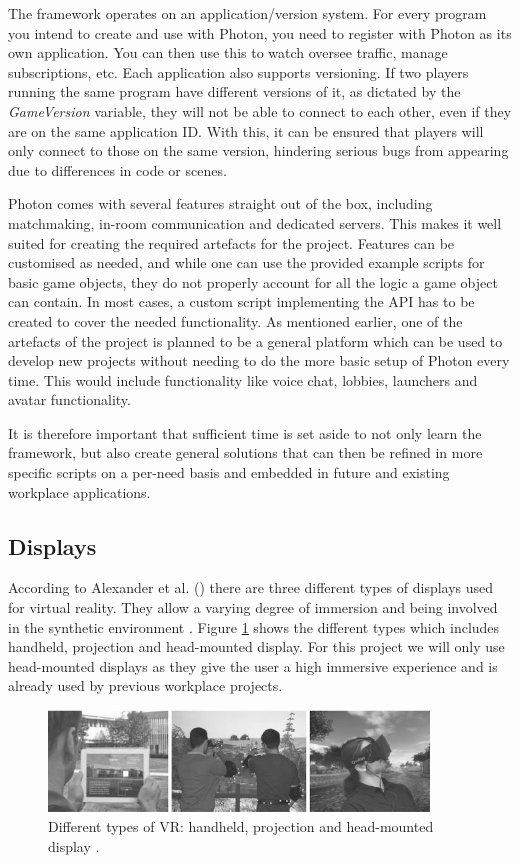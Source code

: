 The framework operates on an application/version system. For every program you intend to create and use with Photon, you need to register with Photon as its own application. You can then use this to watch oversee traffic, manage subscriptions, etc. Each application also supports versioning. If two players running the same program have different versions of it, as dictated by the \textit{GameVersion} variable, they will not be able to connect to each other, even if they are on the same application ID. With this, it can be ensured that players will only connect to those on the same version, hindering serious bugs from appearing due to differences in code or scenes.

Photon comes with several features straight out of the box, including matchmaking, in-room communication and dedicated servers. This makes it well suited for creating the required artefacts for the project. Features can be customised as needed, and while one can use the provided example scripts for basic game objects, they do not properly account for all the logic a game object can contain. In most cases, a custom script implementing the API has to be created to cover the needed functionality. As mentioned earlier, one of the artefacts of the project is planned to be a general platform which can be used to develop new projects without needing to do the more basic setup of Photon every time. This would include functionality like voice chat, lobbies, launchers and avatar functionality.

It is therefore important that sufficient time is set aside to not only learn the framework, but also create general solutions that can then be refined in more specific scripts on a per-need basis and embedded in future and existing workplace applications.


\subsection{Displays}
According to Alexander et al. (\citeyear{alexander2017virtual}) there are three different types of displays used for virtual reality. They allow a varying degree of immersion and being involved in the synthetic environment \cite{alexander2017virtual}. Figure \ref{fig:vrDiplays} shows the different types which includes handheld, projection and head-mounted display. For this project we will only use head-mounted displays as they give the user a high immersive experience and is already used by previous workplace projects.  


\begin{figure}[!ht]
    \centering
    \includegraphics[width=0.9\textwidth]{./fig/background/vrDisplays.PNG}
    \caption{Different types of VR: handheld, projection and head-mounted display \cite{alexander2017virtual}.}
    \label{fig:vrDiplays}
\end{figure}


